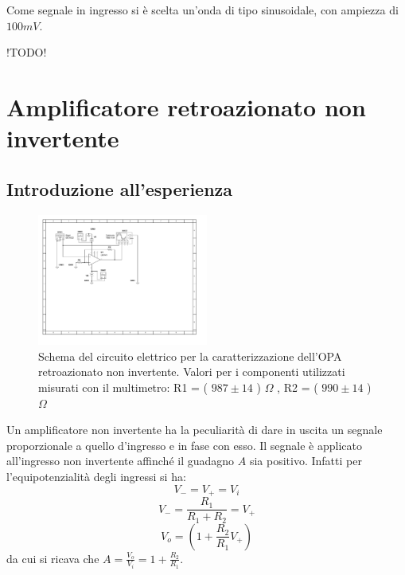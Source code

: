\documentclass[journal]{IEEEtran}
\begin{document}
Come segnale in ingresso si è scelta un'onda di tipo sinusoidale, con ampiezza di $100 mV$.

!TODO!

\section{\textbf{Amplificatore retroazionato non invertente}} %
\subsection{\textbf{Introduzione all'esperienza}}
\begin{figure}[H]%
\begin {center}
\includegraphics[width=0.50\textwidth]{sch-simulations/output/OPA-closed-loop-non-inverting.pdf}
\caption{Schema del circuito elettrico per la caratterizzazione dell'OPA retroazionato non invertente. Valori per i componenti utilizzati misurati con il multimetro: R1 = ( $987 \pm 14$ ) $\Omega$ , R2 = ( $990 \pm 14$ ) $\Omega$}
\label{fig:loop-non-inv}
\end {center}
\end{figure}
Un amplificatore non invertente ha la peculiarità di dare in uscita un segnale proporzionale a quello d'ingresso e in fase con esso. Il segnale è applicato all'ingresso non invertente affinché il guadagno $A$ sia positivo. Infatti per l'equipotenzialità degli ingressi si ha: \[V_{-} = V_{+} = V_{i}\] \[V_{-} = \frac{R_1}{R_1+R_2}=V_{+}\] \[V_{o}=(1+\frac{R_2}{R_1}V_{+})\]
da cui si ricava che $A=\frac{V_{o}}{V_i}=1+\frac{R_2}{R_1}$.
\end{document}
